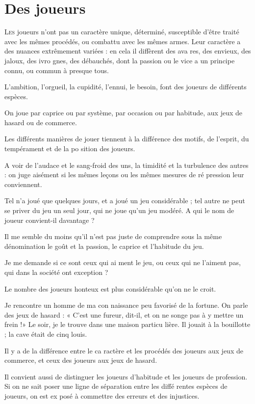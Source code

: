 \chapter{Des joueurs}

\lettrine{L}{es} joueurs n'ont pas un caractère
unique, déterminé, susceptible d'être
traité avec les mêmes procédés, ou
combattu avec les mêmes armes. Leur
caractère a des nuances extrêmement
variées : en cela il diffèrent des ava%
res, des envieux, des jaloux, des ivro%
gnes, des débauchés, dont la passion
ou le vice a un principe connu, ou
commun à presque tous.

L'ambition, l'orgueil, la cupidité,
l'ennui, le besoin, font des joueurs de
différents espèces.

On joue par caprice ou par système,
par occasion ou par habitude, aux jeux
de hasard ou de commerce.

Les différents manières de jouer
tiennent à la différence des motifs, de
l'esprit, du tempérament et de la po%
sition des joueurs.

A voir de l'audace et le sang-froid des
uns, la timidité et la turbulence des
autres : on juge aisément si les mêmes
leçons ou les mêmes mesures de ré%
pression leur conviennent.

Tel n'a joué que quelques jours, et
a joué un jeu considérable ; tel autre
ne peut se priver du jeu un seul jour,
qui ne joue qu'un jeu modéré. A qui le
nom de joueur convient-il davantage ?

Il me semble du moins qu'il n'est
pas juste de comprendre sous la même
dénomination le goût et la passion, le
caprice et l'habitude du jeu.

Je me demande si ce sont ceux qui ai%
ment le jeu, ou ceux qui ne l'aiment
pas, qui dans la société ont exception ?

Le nombre des joueurs honteux est
plus considérable qu'on ne le croit.

Je rencontre un homme de ma con%
naissance peu favorisé de la fortune.
On parle des jeux de hasard : « C'est
une fureur, dit-il, et on ne songe
pas à y mettre un frein !» Le soir,
je le trouve dans une maison particu%
lière. Il jouait à la bouillotte ; la cave
était de cinq louis.

Il y a de la différence entre le ca%
ractère et les procédés des joueurs aux
jeux de commerce, et ceux des joueurs
aux jeux de hasard.

Il convient aussi de distinguer les 
joueurs d'habitude et les joueurs de
profession. Si on ne sait poser une
ligne de séparation entre les diffé%
rentes espèces de joueurs, on est ex%
posé à commettre des erreurs et des
injustices.


